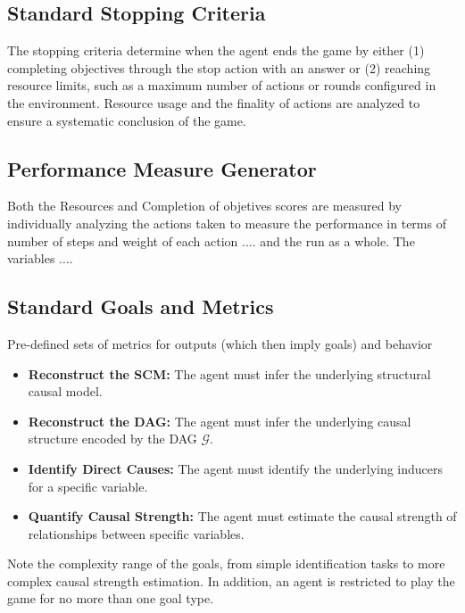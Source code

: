 \documentclass{uai2024} %
\newcommand{\DAG}{\mathcal{G}} %
\begin{document}
    \subsection{Standard Stopping Criteria}
        The stopping criteria determine when the agent ends the game by either (1) completing objectives through the stop action with an answer or (2) reaching resource limits, such as a maximum number of actions or rounds configured in the environment. 
        Resource usage and the finality of actions are analyzed to ensure a systematic conclusion of the game.



    \subsection{Performance Measure Generator}
        Both the Resources and Completion of objetives scores are measured by individually analyzing the actions taken to measure the performance in terms of number of steps and weight of each action .... and the run as a whole.
        The variables $\dots$.



    \subsection{Standard Goals and Metrics}
        Pre-defined sets of metrics for outputs (which then imply goals) and behavior
                
        \begin{itemize}
            \item \textbf{Reconstruct the SCM:} The agent must infer the underlying structural causal model.
            \item \textbf{Reconstruct the DAG:} The agent must infer the underlying causal structure encoded by the DAG $\DAG$.
            \item \textbf{Identify Direct Causes:} The agent must identify the underlying inducers for a specific variable.
            \item \textbf{Quantify Causal Strength:} The agent must estimate the causal strength of relationships between specific variables.
        \end{itemize}

        Note the complexity range of the goals, from simple identification tasks to more complex causal strength estimation. 
        In addition, an agent is restricted to play the game for no more than one goal type. 
\end{document}
